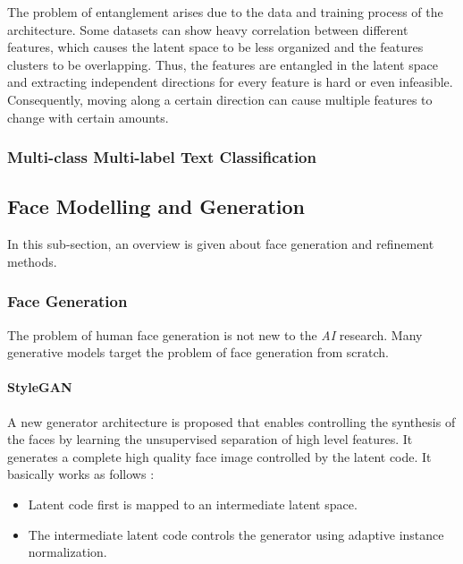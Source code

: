 The problem of entanglement arises due to the data and training process of the architecture. Some datasets can show heavy correlation between different features, which causes the latent space to be less organized and the features clusters to be overlapping. Thus, the features are entangled in the latent space and extracting independent directions for every feature is hard or even infeasible. Consequently, moving along a certain direction can cause multiple features to change with certain amounts.

\subsubsection{Multi-class Multi-label Text Classification}

\subsection{Face Modelling and Generation}
In this sub-section, an overview is given about face generation and refinement methods.

\subsubsection{Face Generation}
The problem of human face generation is not new to the \emph{AI} research. Many generative models target the problem of face generation from scratch.

\paragraph{StyleGAN}
A new generator architecture is proposed that enables controlling the synthesis of the faces by learning the unsupervised separation of high level features. It generates a complete high quality face image controlled by the latent code. It basically works as follows :
\begin{itemize}
    \item Latent code first is mapped to an intermediate latent space.
    \item The intermediate latent code controls the generator using adaptive instance normalization.
\end{itemize}


